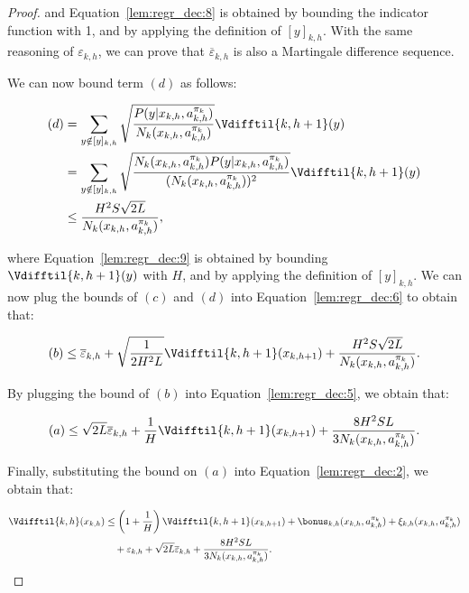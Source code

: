 \begin{proof}
and Equation~\eqref{lem:regr_dec:8} is obtained by bounding the indicator function with 1, and by applying the definition of $[y]_{k,h}$. With the same reasoning of $\varepsilon_{k,h}$, we can prove that $\overline{\varepsilon}_{k,h}$ is also a Martingale difference sequence.

We can now bound term $(d)$ as follows:

\begin{align}
    (d) &= \sum_{y \notin [y]_{k,h}} \sqrt{\frac{P(y|x_{k,h},a_{k,h}^{\pi_k})}{N_k (x_{k,h},a_{k,h}^{\pi_k})}} \Vdifftil{k,h+1}(y) \nonumber \\
    &= \sum_{y \notin [y]_{k,h}} \sqrt{\frac{N_k (x_{k,h},a_{k,h}^{\pi_k}) P(y|x_{k,h},a_{k,h}^{\pi_k})}{(N_k (x_{k,h},a_{k,h}^{\pi_k}))^2}} \Vdifftil{k,h+1}(y) \nonumber \\
    &\le \frac{H^2S \sqrt{2L}}{N_k (x_{k,h}, a_{k,h}^{\pi_k})}, \label{lem:regr_dec:9}
\end{align}

where Equation~\eqref{lem:regr_dec:9} is obtained by bounding $\Vdifftil{k,h+1}(y)$ with $H$, and by applying the definition of $[y]_{k,h}$. We can now plug the bounds of $(c)$ and $(d)$ into Equation~\eqref{lem:regr_dec:6} to obtain that:

\begin{equation*}
    (b) \le \overline{\varepsilon}_{k,h} + \sqrt{\frac{1}{2H^2L}}\Vdifftil{k,h+1}(x_{k,h+1}) + \frac{H^2S\sqrt{2L}}{N_k(x_{k,h}, a_{k,h}^{\pi_k})}.
\end{equation*}

By plugging the bound of $(b)$ into Equation~\eqref{lem:regr_dec:5}, we obtain that:

\begin{equation*}
    (a) \le \sqrt{2L} \overline{\varepsilon}_{k,h} + \frac{1}{H} \Vdifftil{k,h+1}(x_{k,h+1}) + \frac{8H^2SL}{3N_k(x_{k,h},a_{k,h}^{\pi_k})}.
\end{equation*}

Finally, substituting the bound on $(a)$ into Equation~\eqref{lem:regr_dec:2}, we obtain that:

\begin{align*}
    \Vdifftil{k,h}(x_{k,h}) &\le \left(1 + \frac{1}{H}\right) \Vdifftil{k,h+1}(x_{k,h+1}) + \bonus_{k,h}(x_{k,h}, a_{k,h}^{\pi_k}) + 
    \xi_{k,h} (x_{k,h}, a_{k,h}^{\pi_k})\\
    &\quad + \varepsilon_{k,h} + \sqrt{2L} \overline{\varepsilon}_{k,h} + \frac{8H^2SL}{3N_k(x_{k,h},a_{k,h}^{\pi_k})}.
\end{align*}


\end{proof}
